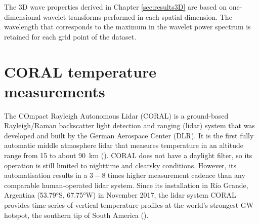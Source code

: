 The 3D wave properties derived in Chapter \ref{sec:results3D} are based on one-dimensional wavelet transforms performed in each spatial dimension. The wavelength that corresponds to the maximum in the wavelet power spectrum is retained for each grid point of the dataset.


\section{CORAL temperature measurements} 
\label{sec:coral}
The COmpact Rayleigh Autonomous Lidar (CORAL) is a ground-based Rayleigh/Raman backscatter light detection and ranging (lidar) system that was developed and built by the German Aerospace Center (DLR). It is the first fully automatic middle atmosphere lidar that measures temperature in an altitude range from 15 to about \SI{90}{\kilo\meter} (\cite{kaifler_compact_2021}). CORAL does not have a daylight filter, so its operation is still limited to nighttime and clearsky conditions. However, its automatisation results in a $3-8$ times higher measurement cadence than any comparable human-operated lidar system. Since its installation in Río Grande, Argentina (53.79°S, 67.75°W) in November 2017, the lidar system CORAL provides time series of vertical temperature profiles at the world's strongest GW hotspot, the southern tip of South America (\cite{kaifler_compact_2021}).

